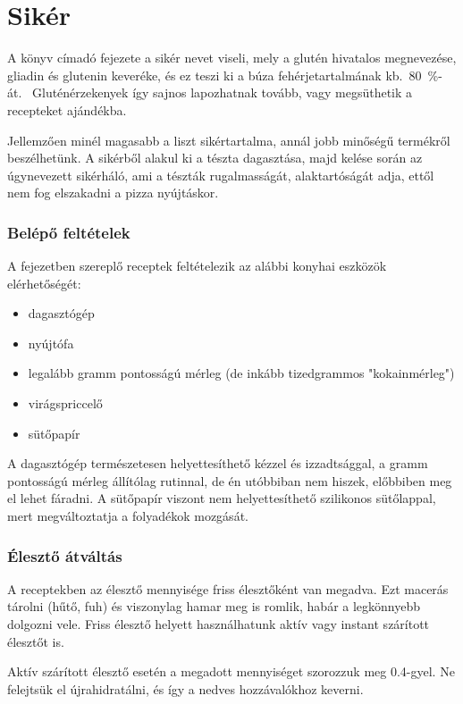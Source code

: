 \chapter*{Sikér}

A könyv címadó fejezete a sikér nevet viseli, mely a glutén hivatalos megnevezése, gliadin és glutenin keveréke, és ez teszi ki a búza fehérjetartalmának kb.~\qty{80}{\percent}-át.~\cite{wiki_gluten} Gluténérzekenyek így sajnos lapozhatnak tovább, vagy megsüthetik a recepteket ajándékba.

Jellemzően minél magasabb a liszt sikértartalma, annál jobb minőségű termékről beszélhetünk. A sikérből alakul ki a tészta dagasztása, majd kelése során az úgynevezett sikérháló, ami a tészták rugalmasságát, alaktartóságát adja, ettől nem fog elszakadni a pizza nyújtáskor.

\subsection*{Belépő feltételek}
A fejezetben szereplő receptek feltételezik az alábbi konyhai eszközök elérhetőségét:
\begin{itemize}
    \item dagasztógép
    \item nyújtófa
    \item legalább gramm pontosságú mérleg (de inkább tizedgrammos "kokainmérleg")
    \item virágspriccelő
    \item sütőpapír
\end{itemize}

A dagasztógép természetesen helyettesíthető kézzel és izzadtsággal, a gramm pontosságú mérleg állítólag rutinnal, de én utóbbiban nem hiszek, előbbiben meg el lehet fáradni. A sütőpapír viszont nem helyettesíthető szilikonos sütőlappal, mert megváltoztatja a folyadékok mozgását.

\subsection*{Élesztő átváltás}
A receptekben az élesztő mennyisége friss élesztőként van megadva. Ezt macerás tárolni (hűtő, fuh) és viszonylag hamar meg is romlik, habár a legkönnyebb dolgozni vele. Friss élesztő helyett használhatunk aktív vagy instant szárított élesztőt is.

Aktív szárított élesztő esetén a megadott mennyiséget szorozzuk meg \num{0.4}-gyel. Ne felejtsük el újrahidratálni, és így a nedves hozzávalókhoz keverni.~\cite{kab_eleszto_atvaltas}

